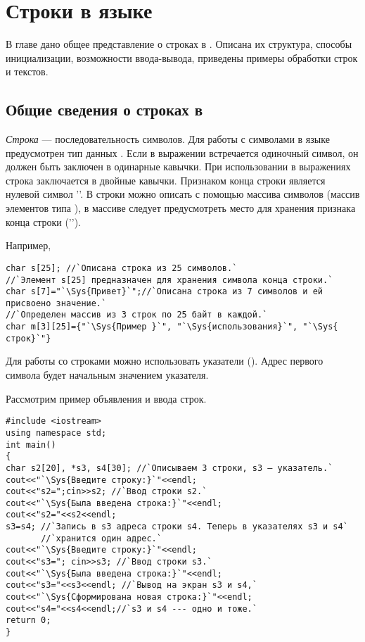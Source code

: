 \chapter[Строки в языке \Sys{C++}]{Строки в языке }\label{ch08}
В главе дано общее представление о строках в . Описана их структура, способы инициализации, возможности ввода-вывода,
приведены примеры обработки строк и текстов.

\section[Общие сведения о строках в \Sys{C++}]{Общие сведения о строках в }\label{ch08:1}
\emph{Строка} --- последовательность символов. Для работы с символами в языке  предусмотрен
тип данных . Если в выражении встречается одиночный символ, он должен быть заключен в одинарные
кавычки. При использовании в выражениях строка заключается в двойные кавычки. Признаком конца строки является нулевой
символ ''. В  строки можно описать с помощью массива символов (массив
элементов типа ), в массиве следует предусмотреть место для хранения признака конца строки
('').

Например, 
\begin{lstlisting}
char s[25]; //`Описана строка из 25 символов.`
//`Элемент s[25] предназначен для хранения символа конца строки.`
char s[7]="`\Sys{Привет}`";//`Описана строка из 7 символов и ей присвоено значение.`
//`Определен массив из 3 строк по 25 байт в каждой.`
char m[3][25]={"`\Sys{Пример }`", "`\Sys{использования}`", "`\Sys{ строк}`"} 
\end{lstlisting}

Для работы со строками можно использовать указатели (). Адрес первого символа будет начальным
значением указателя.

Рассмотрим пример объявления и ввода строк.
\begin{lstlisting}
#include <iostream>
using namespace std;
int main()
{
char s2[20], *s3, s4[30]; //`Описываем 3 строки, s3 — указатель.`
cout<<"`\Sys{Введите строку:}`"<<endl;
cout<<"s2=";cin>>s2; //`Ввод строки s2.`
cout<<"`\Sys{Была введена строка:}`"<<endl;
cout<<"s2="<<s2<<endl;
s3=s4; //`Запись в s3 адреса строки s4. Теперь в указателях s3 и s4` 
       //`хранится один адрес.`
cout<<"`\Sys{Введите строку:}`"<<endl;
cout<<"s3="; cin>>s3; //`Ввод строки s3.`
cout<<"`\Sys{Была введена строка:}`"<<endl;
cout<<"s3="<<s3<<endl; //`Вывод на экран s3 и s4,`
cout<<"`\Sys{Сформирована новая строка:}`"<<endl;
cout<<"s4="<<s4<<endl;//`s3 и s4 --- одно и тоже.`
return 0;
}
\end{lstlisting}

